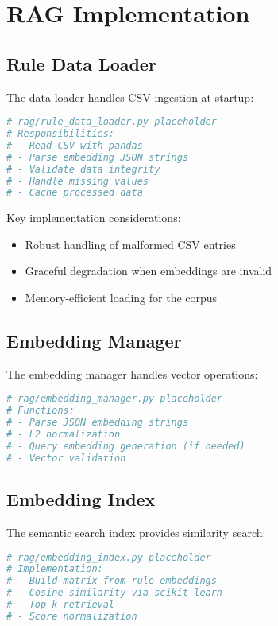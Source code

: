 \section{RAG Implementation}

\subsection{Rule Data Loader}

The data loader handles CSV ingestion at startup:

\begin{lstlisting}[language=Python, caption={Rule data loader implementation}, label={lst:data-loader}]
# rag/rule_data_loader.py placeholder
# Responsibilities:
# - Read CSV with pandas
# - Parse embedding JSON strings
# - Validate data integrity
# - Handle missing values
# - Cache processed data
\end{lstlisting}

Key implementation considerations:
\begin{itemize}[leftmargin=*,itemsep=2pt,topsep=2pt]
 \item Robust handling of malformed CSV entries
 \item Graceful degradation when embeddings are invalid
 \item Memory-efficient loading for the corpus
\end{itemize}

\subsection{Embedding Manager}

The embedding manager handles vector operations:

\begin{lstlisting}[language=Python, caption={Embedding manager operations}, label={lst:embedding-manager}]
# rag/embedding_manager.py placeholder
# Functions:
# - Parse JSON embedding strings
# - L2 normalization
# - Query embedding generation (if needed)
# - Vector validation
\end{lstlisting}

\subsection{Embedding Index}

The semantic search index provides similarity search:

\begin{lstlisting}[language=Python, caption={Embedding index for semantic search}, label={lst:embedding-index}]
# rag/embedding_index.py placeholder
# Implementation:
# - Build matrix from rule embeddings
# - Cosine similarity via scikit-learn
# - Top-k retrieval
# - Score normalization
\end{lstlisting}

